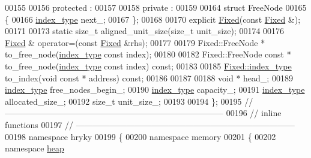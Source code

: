 \begin{DoxyCode}
00155 
00156 \textcolor{keyword}{protected} :
00157 
00158 \textcolor{keyword}{private} :
00159 
00164     \textcolor{keyword}{struct }FreeNode
00165     \{
00166         \hyperlink{classhryky_1_1memory_1_1heap_1_1_fixed_a5031234bccd24fe2b2ea6ff6ae5cdcdd}{index_type} next\_;
00167     \};
00168 
00170     \textcolor{keyword}{explicit} \hyperlink{classhryky_1_1memory_1_1heap_1_1_fixed_ab063172ff9026356d34cac6dc39a207a}{Fixed}(\textcolor{keyword}{const} \hyperlink{classhryky_1_1memory_1_1heap_1_1_fixed_ab063172ff9026356d34cac6dc39a207a}{Fixed} &);
00171 
00173     \textcolor{keyword}{static} \textcolor{keywordtype}{size\_t} aligned\_unit\_size(\textcolor{keywordtype}{size\_t} unit\_size);
00174 
00176     \hyperlink{classhryky_1_1memory_1_1heap_1_1_fixed_ab063172ff9026356d34cac6dc39a207a}{Fixed} & operator=(\textcolor{keyword}{const} \hyperlink{classhryky_1_1memory_1_1heap_1_1_fixed_ab063172ff9026356d34cac6dc39a207a}{Fixed} &rhs);
00177 
00179     Fixed::FreeNode * to\_free\_node(\hyperlink{classhryky_1_1memory_1_1heap_1_1_fixed_a5031234bccd24fe2b2ea6ff6ae5cdcdd}{index_type} \textcolor{keyword}{const} index);
00180 
00182     Fixed::FreeNode \textcolor{keyword}{const} * to\_free\_node(\hyperlink{classhryky_1_1memory_1_1heap_1_1_fixed_a5031234bccd24fe2b2ea6ff6ae5cdcdd}{index_type} \textcolor{keyword}{const} index) \textcolor{keyword}{const};
00183 
00185     \hyperlink{classhryky_1_1memory_1_1heap_1_1_fixed_a5031234bccd24fe2b2ea6ff6ae5cdcdd}{Fixed::index_type} to\_index(\textcolor{keywordtype}{void} \textcolor{keyword}{const} * address) \textcolor{keyword}{const};
00186 
00187     
00188     \textcolor{keywordtype}{void} *          head\_;              
00189     \hyperlink{classhryky_1_1memory_1_1heap_1_1_fixed_a5031234bccd24fe2b2ea6ff6ae5cdcdd}{index_type}      free\_nodes\_begin\_;  
00190     \hyperlink{classhryky_1_1memory_1_1heap_1_1_fixed_a5031234bccd24fe2b2ea6ff6ae5cdcdd}{index_type}      capacity\_;
00191     \hyperlink{classhryky_1_1memory_1_1heap_1_1_fixed_a5031234bccd24fe2b2ea6ff6ae5cdcdd}{index_type}      allocated\_size\_;
00192     \textcolor{keywordtype}{size\_t}          unit\_size\_;
00193     
00194 \};
00195 \textcolor{comment}{//
      ------------------------------------------------------------------------------}
00196 \textcolor{comment}{// inline functions}
00197 \textcolor{comment}{//
      ------------------------------------------------------------------------------}
00198 \textcolor{keyword}{namespace }hryky
00199 \{
00200 \textcolor{keyword}{namespace }memory
00201 \{
00202 \textcolor{keyword}{namespace }\hyperlink{namespacehryky_1_1memory_1_1global_a6fc6103f67c837aa0f39b359588409cd}{heap}

\end{DoxyCode}
